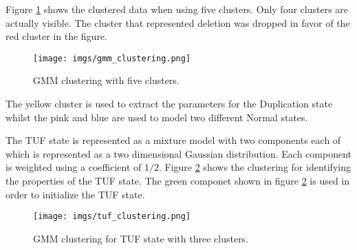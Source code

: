  
Figure \ref{gmm_clustering} shows the clustered data when using five clusters. Only four clusters are actually visible. The cluster that represented deletion was dropped in favor of the  red cluster in the figure.  

\begin{figure}[!htb]
	\begin{center}
		\texttt{[image: imgs/gmm\_clustering.png]}
	\end{center}
	\caption{GMM clustering with five clusters.}
	\label{gmm_clustering}
\end{figure}  

The yellow cluster is used to extract the parameters for the Duplication state whilst the pink and blue are used to model two different Normal states.

The TUF state is represented as a mixture model with two components each of which is represented as a two dimensional Gaussian distribution. Each component is weighted using a coefficient of $1/2$.  Figure \ref{tuf_clustering} shows the clustering for identifying the properties of the TUF state. The green componet shown in figure \ref{tuf_clustering} is used in order to initialize the TUF state.

\begin{figure}[!htb]
	\begin{center}
		\texttt{[image: imgs/tuf\_clustering.png]}
	\end{center}
	\caption{GMM clustering for TUF state with three clusters.}
	\label{tuf_clustering}
\end{figure} 

